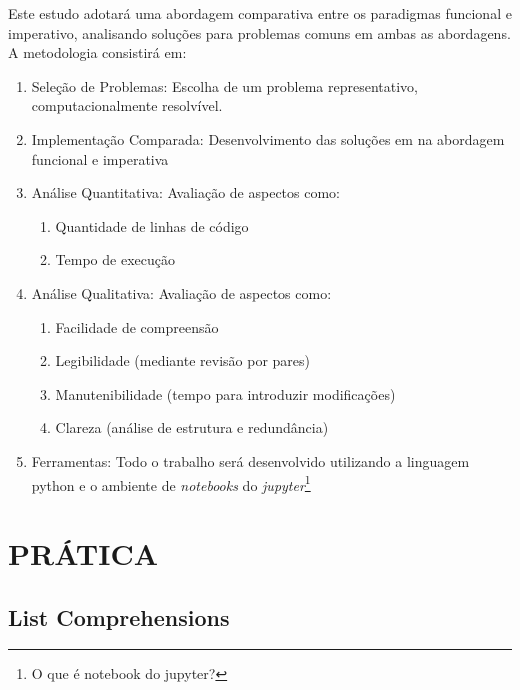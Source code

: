\documentclass[date,twocolumn,a4paper]{ppgem}
\begin{document}
    Este estudo adotará uma abordagem comparativa entre os paradigmas funcional e imperativo, analisando soluções para problemas comuns em ambas as abordagens. A metodologia consistirá em:
    \begin{enumerate}
        \item Seleção de Problemas: Escolha de um problema representativo, computacionalmente resolvível.
        \item Implementação Comparada: Desenvolvimento das soluções em na abordagem funcional e imperativa
        \item Análise Quantitativa: Avaliação de aspectos como:
        \begin{enumerate}
            \item Quantidade de linhas de código
            \item Tempo de execução
        \end{enumerate}
        \item Análise Qualitativa: Avaliação de aspectos como:
        \begin{enumerate}
            \item Facilidade de compreensão
            \item Legibilidade (mediante revisão por pares)
            \item Manutenibilidade (tempo para introduzir modificações)
            \item Clareza (análise de estrutura e redundância)
        \end{enumerate}
        \item Ferramentas: Todo o trabalho será desenvolvido utilizando a linguagem python
            e o ambiente de \textit{notebooks} do \textit{jupyter}\footnote{O que é notebook do jupyter?}
    \end{enumerate}




    \section{PRÁTICA}

    \subsection{List Comprehensions}
\end{document}
